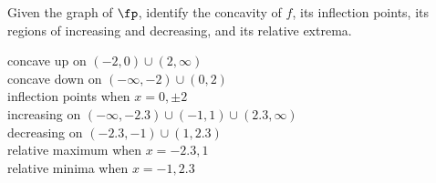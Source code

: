 {Given the graph of $\fp$, identify the concavity of $f$, its inflection points, its regions of increasing and decreasing, and its relative extrema.\\
}
{concave up on $(-2,0)\cup(2,\infty)$\\
concave down on $(-\infty,-2)\cup(0,2)$\\
inflection points when $x=0,\pm2$\\
increasing on $(-\infty,-2.3)\cup(-1,1)\cup(2.3,\infty)$\\
decreasing on $(-2.3,-1)\cup(1,2.3)$\\
relative maximum when $x=-2.3,1$\\
relative minima when $x=-1,2.3$}
